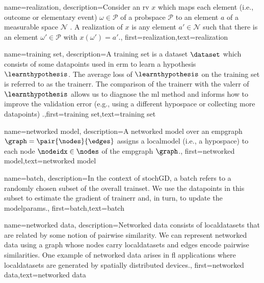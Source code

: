 {{	
{name={realization},
	description={Consider an \gls{rv} $x$ which maps each element 
	(i.e., outcome or elementary event) $\omega \in \mathcal{P}$ of a \gls{probspace} $\mathcal{P}$ 
	to an element $a$ of a measurable space $\mathcal{N}$ \cite{BillingsleyProbMeasure,RudinBookPrinciplesMatheAnalysis,HalmosMeasure}. 
	A realization of $x$ is any element $a' \in \mathcal{N}$ such that there is 
	an element $\omega' \in \mathcal{P}$ with $x(\omega') = a'$.}, first={realization},text={realization}  }

{name={training set},
description={A training set is a \gls{dataset} $\dataset$ which consists of some \gls{datapoint}s used in \gls{erm} 
	to learn a \gls{hypothesis} $\learnthypothesis$. The average \gls{loss} of $\learnthypothesis$ on the 
	training set is referred to as the \gls{trainerr}. The comparison of the \gls{trainerr} with the 
	\gls{valerr} of $\learnthypothesis$ allows us to diagnose the \gls{ml} method and informs how to improve 
	the validation error (e.g., using a different \gls{hypospace} or collecting more \gls{datapoint}s) \cite[Sec. 6.6]{MLBasics}.},first={training set},text={training set}  
}

{name={networked model},
  description={A networked \gls{model} over an \gls{empgraph} $\graph = \pair{\nodes}{\edges}$ assigns 
   a \gls{localmodel} (i.e., a \gls{hypospace}) to each node $\nodeidx \in \nodes$ of the \gls{empgraph} $\graph$.}, 
   first={networked model},text={networked model}  
}

{
	name={batch},
	description={In the context of \gls{stochGD}, a batch refers to a randomly 
	chosen subset of the overall \gls{trainset}. We use the \gls{datapoint}s in this subset 
	to estimate the \gls{gradient} of \gls{trainerr} and, in turn, to update the \gls{modelparams}.}, 
	first={batch},text={batch}  
}

{
	name={networked data},
	description={Networked \gls{data} consists of \gls{localdataset}s 
	that are related by some notion of pairwise similarity. We can represent networked 
	\gls{data} using a \gls{graph} whose nodes carry \gls{localdataset}s and edges encode 
	pairwise similarities. One example of networked \gls{data} arises in \gls{fl} applications 
	where \gls{localdataset}s are generated by spatially distributed \gls{device}s.}, 
	first={networked data},text={networked data}  
}

}}
